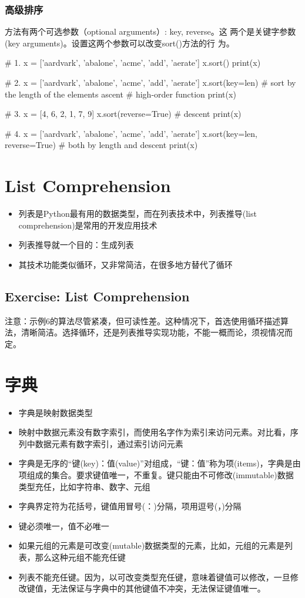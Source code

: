 \subsubsection{高级排序}
方法有两个可选参数（optional arguments）: key, reverse。这
两个是关键字参数(key arguments)。设置这两个参数可以改变sort()方法的行
为。
\begin{python}
  # 1. 
x = ['aardvark', 'abalone', 'acme', 'add', 'aerate']
x.sort()  
print(x)

# 2.
x = ['aardvark', 'abalone', 'acme', 'add', 'aerate']
x.sort(key=len) # sort by the length of the elements ascent
                # high-order function
print(x)
                 
   # 3.
x = [4, 6, 2, 1, 7, 9]
x.sort(reverse=True)  # descent
print(x)

  # 4.
x = ['aardvark', 'abalone', 'acme', 'add', 'aerate']
x.sort(key=len, reverse=True)  # both by length and descent
print(x)
\end{python}
\section{List Comprehension}
\begin{itemize}
\item 列表是Python最有用的数据类型，而在列表技术中，列表推导(list comprehension)是常用的开发应用技术
\item 列表推导就一个目的：生成列表
\item 其技术功能类似循环，又非常简洁，在很多地方替代了循环
\end{itemize}
\subsection{Exercise: List Comprehension}
注意：示例6的算法尽管紧凑，但可读性差。这种情况下，首选使用循环描述算法，清晰简洁。选择循环，还是列表推导实现功能，不能一概而论，须视情况而定。
\section{字典}
\begin{itemize}
\item 字典是映射数据类型
\item 映射中数据元素没有数字索引，而使用名字作为索引来访问元素。对比看，序列中数据元素有数字索引，通过索引访问元素
\item 字典是无序的“键(key)：值(value)”对组成，“键：值”称为项(items)，字典是由项组成的集合。要求键值唯一，不重复。键只能由不可修改(immutable)数据类型充任，比如字符串、数字、元组
\item 字典界定符为花括号{}，键值用冒号(：)分隔，项用逗号(，)分隔
\item 键必须唯一，值不必唯一
\item 如果元组的元素是可改变(mutable)数据类型的元素，比如，元组的元素是列表，那么这种元组不能充任键
\item 列表不能充任键。因为，以可改变类型充任键，意味着键值可以修改，一旦修改键值，无法保证与字典中的其他键值不冲突，无法保证键值唯一。
\end{itemize}
